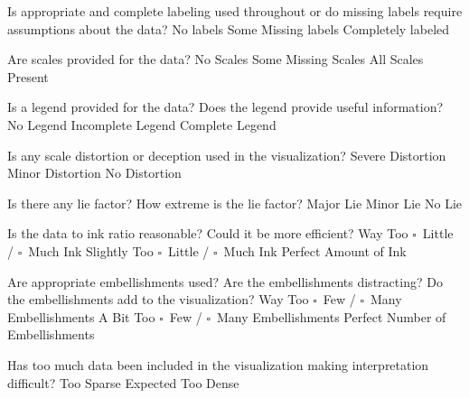 \documentclass[a4paper,12pt]{article}
\begin{document}
\EndTable  

\vspace{15pt}


   	{Is appropriate and complete labeling used throughout or do 
      	missing labels require assumptions about the data?}
    {\choice No labels}
    {\choice Some Missing labels}
    {\choice Completely labeled} 
        
   	{Are scales provided for the data?}
	{\choice No Scales}
	{\choice Some Missing Scales}
	{\choice All Scales Present} 

	{Is a legend provided for the data? Does the legend provide useful 
    	information?}
	{\choice No Legend}
	{\choice Incomplete Legend}
	{\choice Complete Legend} 
        
        
\EndTable  



	{Is any scale distortion or deception used in the visualization?}	
	{\choice Severe Distortion}
	{\choice Minor Distortion}
	{\choice No Distortion} 
        
	{Is there any lie factor? How extreme is the lie factor?}
	{\choice Major Lie}
	{\choice Minor Lie}
	{\choice No Lie} 

	{Is the data to ink ratio reasonable? Could it be more efficient?}
	{Way Too $\square$~Little / $\square$~Much Ink}
	{Slightly Too $\square$~Little / $\square$~Much Ink}
	{\choice Perfect Amount of Ink} 
        
	{Are appropriate embellishments used? Are the embellishments 
    	distracting? Do the embellishments add to the visualization?}
	{Way Too $\square$~Few / $\square$~Many Embellishments}
	{A Bit Too $\square$~Few / $\square$~Many Embellishments}
	{\choice Perfect Number of Embellishments} 
        
	{Has too much data been included in the visualization making 
    	interpretation difficult? } 
	{\choice Too Sparse}
	{\choice Expected}
	{\choice Too Dense} 
        
\EndTable  
        


\newpage
\end{document}
